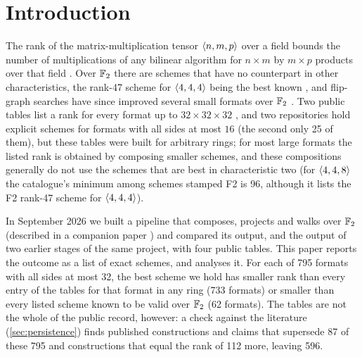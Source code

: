 \section{Introduction}\label{sec:intro}

The rank of the matrix-multiplication tensor $\langle n,m,p\rangle$ over a field bounds the number of multiplications of any bilinear algorithm for $n\times m$ by $m\times p$ products over that field \cite{burgisser1997algebraic,landsberg2012tensors}.
Over ${\mathbb{F}_2}$ there are schemes that have no counterpart in other characteristics, the rank-47 scheme for $\langle 4,4,4\rangle$ being the best known \cite{fawzi2022discovering}, and flip-graph searches have since improved several small formats over ${\mathbb{F}_2}$
\cite{kauers2023flip,kauers2022still,arai2024adaptive,moosbauer2025flip,kauers2025meta,medley2026gpu}.
Two public tables list a rank for every format up to $32\times32\times32$ \cite{sedoglavic2026catalogue,lacelle2026catalog}, and two repositories hold explicit schemes for formats with all sides at most $16$ \cite{perminov2026fmmrepo,witteveen2026schemes} (the second only 25 of them), but these tables were built for arbitrary rings;
for most large formats the listed rank is obtained by composing smaller schemes, and these compositions generally do not use the schemes that are best in characteristic two (for $\langle 4,4,8\rangle$ the catalogue's minimum among schemes stamped F2 is 96, although it lists the F2 rank-47 scheme for $\langle 4,4,4\rangle$).

In September 2026 we built a pipeline that composes, projects and walks over ${\mathbb{F}_2}$ (described in a companion paper \cite{peterson2026methods}) and compared its output, and the output of two earlier stages of the same project, with four public tables.
This paper reports the outcome as a list of exact schemes, and analyses it.
For each of 795 formats with all sides at most 32, the best scheme we hold has smaller rank than every entry of the tables for that format in any ring (733 formats) or smaller than every listed scheme known to be valid over ${\mathbb{F}_2}$ (62 formats).
The tables are not the whole of the public record, however: a check against the literature (\cref{sec:persistence}) finds published constructions and claims that supersede 87 of these 795 and constructions that equal the rank of 112 more, leaving 596.

